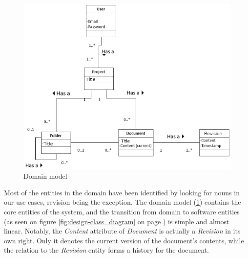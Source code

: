 \begin{figure}[hbt]
	\centering
	\includegraphics[width=1\textwidth]{Software_analysis/graphics/Domain_model.png}
	\caption{Domain model}
	\label{fig:domain-model}
\end{figure}
Most of the entities in the \SOP{} domain have been identified by looking for nouns in our use cases, revision being the exception.
The domain model (\ref{fig:domain-model}) contains the core entities of the \SOP{} system, and the transition from domain to software entities (as seen on figure \ref{fig:design-class_diagram} on page \pageref{fig:design-class_diagram}) is simple and almost linear.
Notably, the \emph{Content} attribute of \emph{Document} is actually a \emph{Revision} in 
its own right. Only it denotes the current version of the document's contents, while the relation to the \emph{Revision} entity forms a history for the document.